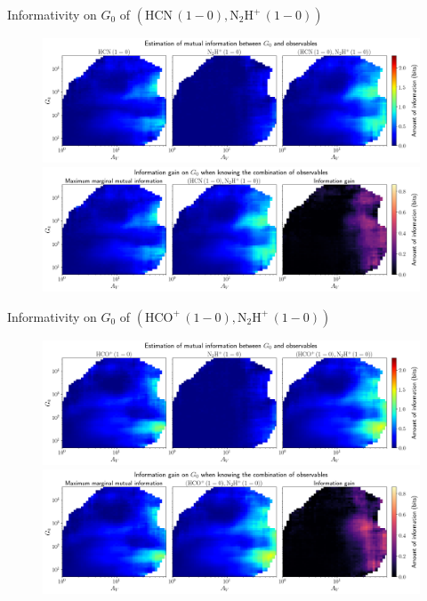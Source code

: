 \documentclass{beamer}
\begin{document}
\begin{frame}{Informativity on $G_0$ of $\left(\mathrm{HCN\,(1-0)},\mathrm{N_2H^+\,(1-0)}\right)$}
    \begin{figure}
        \centering
        \includegraphics[width=0.95\linewidth]{../mi/g0__hcn10_n2hp10_mi.png}
        \vfill
        \includegraphics[width=0.95\linewidth]{../mi/g0__hcn10_n2hp10_mi_gain.png}
    \end{figure}
\end{frame}

\begin{frame}{Informativity on $G_0$ of $\left(\mathrm{HCO^+\,(1-0)},\mathrm{N_2H^+\,(1-0)}\right)$}
    \begin{figure}
        \centering
        \includegraphics[width=0.95\linewidth]{../mi/g0__hcop10_n2hp10_mi.png}
        \vfill
        \includegraphics[width=0.95\linewidth]{../mi/g0__hcop10_n2hp10_mi_gain.png}
    \end{figure}
\end{frame}
\end{document}
